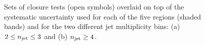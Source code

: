 \begin{figure}[h!]
  \begin{center}
     \\
     \\
    \caption{Sets of closure tests (open symbols) overlaid on top of
      the systematic uncertainty used for each of the five \scalht
      regions (shaded bands) and for the two different jet
      multiplicity bins: (a) $2 \leq n_{\text{jet}} \leq 3$ and (b) $n_{\text{jet}} \geq
      4$.  }
    \label{fig:closure}
  \end{center} 
\end{figure}

